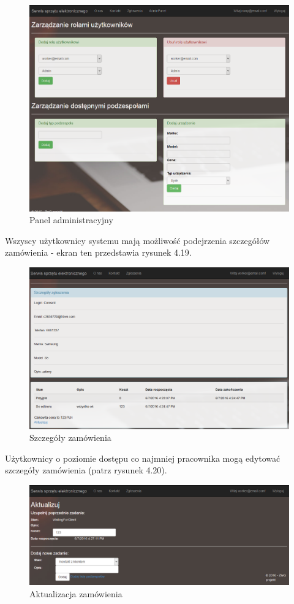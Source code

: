 \documentclass[a4paper,11pt]{article}
\begin{document}
\begin{figure}[H]
	\centering
	\includegraphics[width=\textwidth,height=0.6\textheight]{serwisAdmin.png}
	\caption{Panel administracyjny}
\end{figure}
\newpage
Wszyscy użytkownicy systemu mają możliwość podejrzenia szczegółów zamówienia - ekran ten przedstawia rysunek 4.19.
\begin{figure}[H]
	\centering
	\includegraphics[width=\textwidth,height=0.6\textheight]{szczegoly.png}
	\caption{Szczegóły zamówienia}
\end{figure}
Użytkownicy o poziomie dostępu co najmniej pracownika mogą edytować szczegóły zamówienia (patrz rysunek 4.20).
\begin{figure}[H]
	\centering
	\includegraphics[width=\textwidth,height=0.3\textheight]{aktualizacja.png}
	\caption{Aktualizacja zamówienia}
\end{figure}
\end{document}
